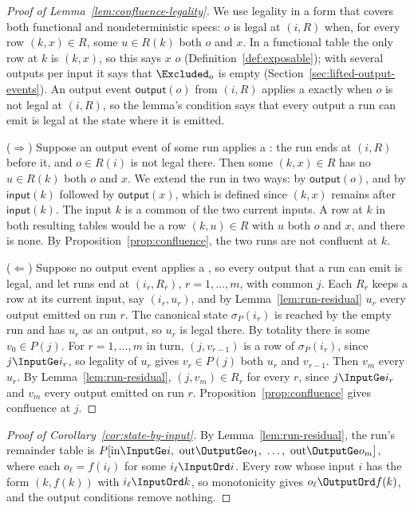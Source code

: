 \begin{proof}[Proof of Lemma~\ref{lem:confluence-legality}]
We use legality in a form that covers both functional and nondeterministic
specs: $o$ is legal at $(i,R)$ when, for every row $(k,x)\in R$, some
$u\in R(k)$ \outrel both $o$ and $x$.  In a functional table the only row at
$k$ is $(k,x)$, so this says $x$ \outrel $o$
(Definition~\ref{def:exposable}); with several outputs per input it says that
$\Excluded_o$ is empty (Section~\ref{sec:lifted-output-events}).  An output
event $\mathsf{output}(o)$ from $(i,R)$ applies a \commitment exactly when $o$
is not legal at $(i,R)$, so the lemma's condition says that every output a run
can emit is legal at the state where it is emitted.

($\Rightarrow$) Suppose an output event of some run applies a \commitment: the
run ends at $(i,R)$ before it, and $o\in R(i)$ is not legal there.  Then some $(k,x)\in R$ has no $u\in R(k)$ \outrelpart both $o$ and
$x$.  We extend the run in two ways: by $\mathsf{output}(o)$, and by
$\mathsf{input}(k)$ followed by $\mathsf{output}(x)$, which is defined since
$(k,x)$ remains after $\mathsf{input}(k)$.  The input $k$ is a common \indesc
of the two current inputs.  A row at $k$ in both resulting tables would be a
row $(k,u)\in R$ with $u$ \outrelpart both $o$ and $x$, and there is none.  By
Proposition~\ref{prop:confluence}, the two runs are not confluent at $k$.

($\Leftarrow$) Suppose no output event applies a \commitment, so every output
that a run can emit is legal, and let runs
end at $(i_r,R_r)$, $r=1,\ldots,m$, with common \indesc $j$.  Each $R_r$ keeps a
row at its current input, say $(i_r,u_r)$, and by Lemma~\ref{lem:run-residual}
$u_r$ \outrel every output emitted on run $r$.  The canonical state
$\sigma_P(i_r)$ is reached by the empty run and has $u_r$ as an output, so $u_r$
is legal there.  By totality there is some $v_0\in P(j)$.  For $r=1,\ldots,m$
in turn, $(j,v_{r-1})$ is a row of $\sigma_P(i_r)$, since $j\InputGe i_r$, so
legality of $u_r$ gives $v_r\in P(j)$ \outrelpart both $u_r$ and $v_{r-1}$.
Then $v_m$ \outrel every $u_r$.  By Lemma~\ref{lem:run-residual},
$(j,v_m)\in R_r$ for every $r$, since $j\InputGe i_r$ and $v_m$ \outrel every
output emitted on run $r$.  Proposition~\ref{prop:confluence} gives
confluence at $j$.
\end{proof}

\begin{proof}[Proof of Corollary~\ref{cor:state-by-input}]
By Lemma~\ref{lem:run-residual}, the run's remainder table is
$P[\mathrm{in}\InputGe i,\ \mathrm{out}\OutputGe o_1,\ \ldots,\
\mathrm{out}\OutputGe o_m]$, where each $o_\ell=f(i_\ell)$ for some
$i_\ell\InputOrd i$.  Every row whose input \inrel $i$ has the form $(k,f(k))$ with
$i_\ell\InputOrd k$, so monotonicity gives $o_\ell\OutputOrd f(k)$, and the
output conditions remove nothing.
\end{proof}

